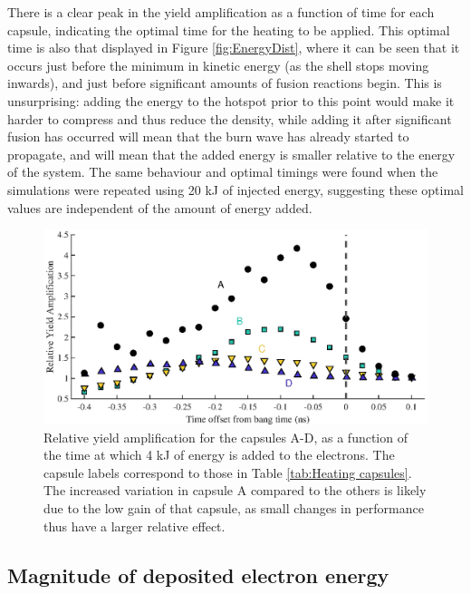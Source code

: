 There is a clear peak in the yield amplification as a function of time for each capsule, indicating the optimal time for the heating to be applied. This optimal time is also that displayed in Figure \ref{fig:EnergyDist}, where it can be seen that it occurs just before the minimum in kinetic energy (as the shell stops moving inwards), and just before significant amounts of fusion reactions begin. This is unsurprising: adding the energy to the hotspot prior to this point would make it harder to compress and thus reduce the density, while adding it after significant fusion has occurred will mean that the burn wave has already started to propagate, and will mean that the added energy is smaller relative to the energy of the system. The same behaviour and optimal timings were found when the simulations were repeated using 20 kJ of injected energy, suggesting these optimal values are independent of the amount of energy added.

\begin{figure}[ht]
\centering
\includegraphics{figures/FurtherSims/HeatingTiming.eps}
\caption{Relative yield amplification for the capsules A-D, as a function of the time at which 4 kJ of energy is added to the electrons. The capsule labels correspond to those in Table \ref{tab:Heating capsules}. The increased variation in capsule A compared to the others is likely due to the low gain of that capsule, as small changes in performance thus have a larger relative effect.}
\label{fig:HeatingTiming}
\end{figure}

\subsection{Magnitude of deposited electron energy}

